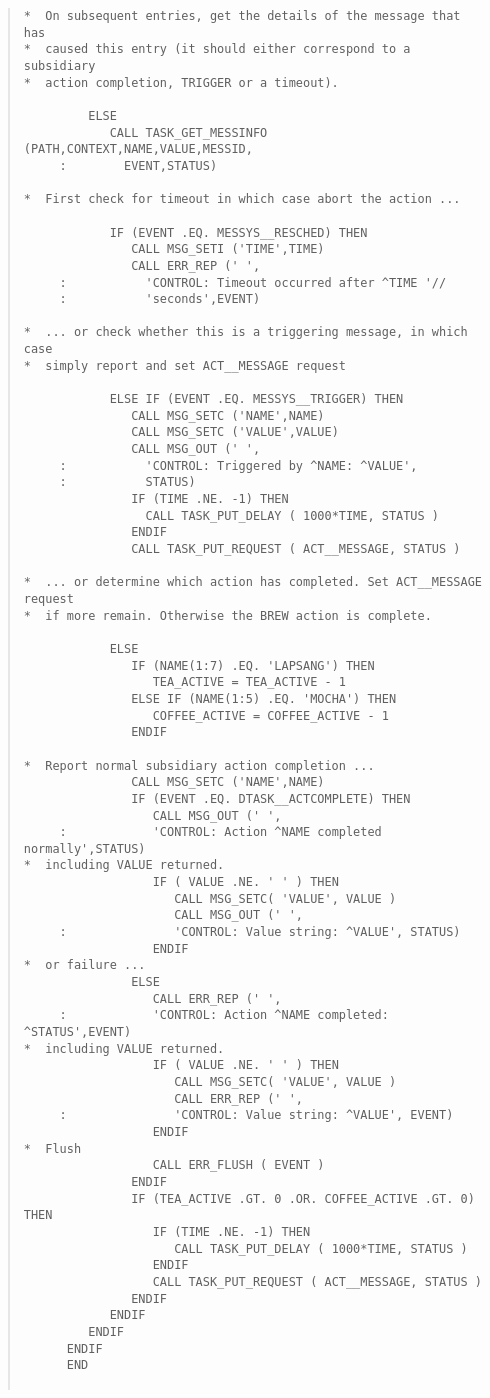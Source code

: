 \documentclass[twoside,11pt]{article}
\renewcommand{\_}{\texttt{\symbol{95}}}
\begin{document}
\begin{quote}
\begin{verbatim}
*  On subsequent entries, get the details of the message that has
*  caused this entry (it should either correspond to a subsidiary
*  action completion, TRIGGER or a timeout).
 
         ELSE
            CALL TASK_GET_MESSINFO (PATH,CONTEXT,NAME,VALUE,MESSID,
     :        EVENT,STATUS)

*  First check for timeout in which case abort the action ...

            IF (EVENT .EQ. MESSYS__RESCHED) THEN
               CALL MSG_SETI ('TIME',TIME)
               CALL ERR_REP (' ',
     :           'CONTROL: Timeout occurred after ^TIME '//
     :           'seconds',EVENT)

*  ... or check whether this is a triggering message, in which case
*  simply report and set ACT__MESSAGE request

            ELSE IF (EVENT .EQ. MESSYS__TRIGGER) THEN
               CALL MSG_SETC ('NAME',NAME)
               CALL MSG_SETC ('VALUE',VALUE)
               CALL MSG_OUT (' ',
     :           'CONTROL: Triggered by ^NAME: ^VALUE',
     :           STATUS)
               IF (TIME .NE. -1) THEN
                 CALL TASK_PUT_DELAY ( 1000*TIME, STATUS )
               ENDIF
               CALL TASK_PUT_REQUEST ( ACT__MESSAGE, STATUS )

*  ... or determine which action has completed. Set ACT__MESSAGE request
*  if more remain. Otherwise the BREW action is complete.
 
            ELSE
               IF (NAME(1:7) .EQ. 'LAPSANG') THEN
                  TEA_ACTIVE = TEA_ACTIVE - 1
               ELSE IF (NAME(1:5) .EQ. 'MOCHA') THEN
                  COFFEE_ACTIVE = COFFEE_ACTIVE - 1
               ENDIF

*  Report normal subsidiary action completion ...
               CALL MSG_SETC ('NAME',NAME)
               IF (EVENT .EQ. DTASK__ACTCOMPLETE) THEN
                  CALL MSG_OUT (' ',
     :            'CONTROL: Action ^NAME completed normally',STATUS)
*  including VALUE returned.
                  IF ( VALUE .NE. ' ' ) THEN
                     CALL MSG_SETC( 'VALUE', VALUE )
                     CALL MSG_OUT (' ',
     :               'CONTROL: Value string: ^VALUE', STATUS)
                  ENDIF                  
*  or failure ...
               ELSE
                  CALL ERR_REP (' ',
     :            'CONTROL: Action ^NAME completed: ^STATUS',EVENT)
*  including VALUE returned.
                  IF ( VALUE .NE. ' ' ) THEN
                     CALL MSG_SETC( 'VALUE', VALUE )
                     CALL ERR_REP (' ',
     :               'CONTROL: Value string: ^VALUE', EVENT)
                  ENDIF                  
*  Flush 
                  CALL ERR_FLUSH ( EVENT )
               ENDIF
               IF (TEA_ACTIVE .GT. 0 .OR. COFFEE_ACTIVE .GT. 0) THEN
                  IF (TIME .NE. -1) THEN
                     CALL TASK_PUT_DELAY ( 1000*TIME, STATUS )
                  ENDIF
                  CALL TASK_PUT_REQUEST ( ACT__MESSAGE, STATUS )
               ENDIF
            ENDIF
         ENDIF
      ENDIF
      END


\end{verbatim}
\end{quote}
\end{document}
